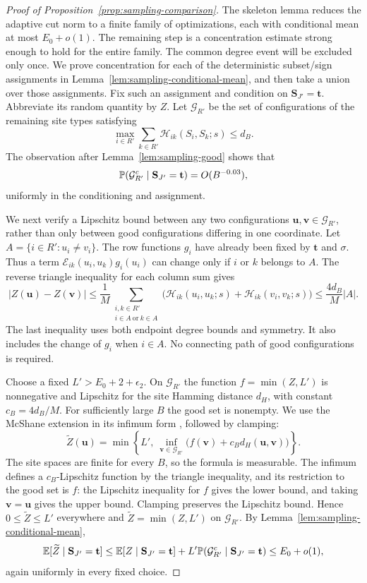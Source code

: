 \begin{proof}[Proof of Proposition~\ref{prop:sampling-comparison}]
The skeleton lemma reduces the adaptive cut norm to a finite family of
optimizations, each with conditional mean at most $E_0+o(1)$. The remaining
step is a concentration estimate strong enough to hold for the entire
family. The common degree event will be excluded only once.
We prove concentration for each of the deterministic subset/sign
assignments in Lemma~\ref{lem:sampling-conditional-mean}, and then
take a union over those assignments.  Fix such an assignment and
condition on $\mathbf S_{J'}=\mathbf t$.  Abbreviate its random
quantity by $Z$.  Let $\mathcal G_{R'}$ be the set of configurations
of the remaining site types satisfying
\[
 \max_{i\in R'}\sum_{k\in R'}
                \mathcal H_{ik}(S_i,S_k;s)\le d_B.
\]
The observation after Lemma~\ref{lem:sampling-good} shows that
\[
 \mathbb P(\mathcal G_{R'}^c\mid\mathbf S_{J'}=\mathbf t)
       =O(B^{-0.03}),
\]
uniformly in the conditioning and assignment.

We next verify a Lipschitz bound between any two configurations
$\mathbf u,\mathbf v\in\mathcal G_{R'}$, rather than only
between good configurations differing in one coordinate.  Let
$A=\{i\in R':u_i\ne v_i\}$.  The row functions $g_i$ have
already been fixed by $\mathbf t$ and $\sigma$.  Thus a term
$\mathcal E_{ik}(u_i,u_k)g_i(u_i)$ can change only if $i$ or $k$
belongs to $A$.  The reverse triangle inequality for each column
sum gives
\[
 |Z(\mathbf u)-Z(\mathbf v)|
 \le\frac1M
   \sum_{\substack{i,k\in R'\\ i\in A\ \text{or}\ k\in A}}
       \big(\mathcal H_{ik}(u_i,u_k;s)
             +\mathcal H_{ik}(v_i,v_k;s)\big)
 \le\frac{4d_B}{M}|A|.
\]
The last inequality uses both endpoint degree bounds and symmetry.
It also includes the change of $g_i$ when $i\in A$.  No connecting
path of good configurations is required.

Choose a fixed $L'>E_0+2+\epsilon_2$.  On $\mathcal G_{R'}$
the function $f=\min(Z,L')$ is nonnegative and Lipschitz for the
site Hamming distance $d_H$, with constant $c_B=4d_B/M$.
For sufficiently large $B$ the good set is nonempty.  We use the
McShane extension \citep{McShane1934} in its infimum form
\citep[Section~3, Equation~(3.2)]{Caputti1984}, followed by clamping:
\[
 \widetilde Z(\mathbf u)
 =\min\left\{L',\ \inf_{\mathbf v\in\mathcal G_{R'}}
             \big(f(\mathbf v)+c_Bd_H(\mathbf u,\mathbf v)\big)
       \right\}.
\]
The site spaces are finite for every $B$, so the formula is
measurable.  The infimum defines a $c_B$-Lipschitz function by
the triangle inequality, and its restriction to the good set is
$f$: the Lipschitz inequality for $f$ gives the lower bound,
and taking $\mathbf v=\mathbf u$ gives the upper bound.
Clamping preserves the Lipschitz bound.  Hence
$0\le\widetilde Z\le L'$ everywhere and
$\widetilde Z=\min(Z,L')$ on $\mathcal G_{R'}$.
By Lemma~\ref{lem:sampling-conditional-mean},
\[
 \mathbb E[\widetilde Z\mid\mathbf S_{J'}=\mathbf t]
 \le\mathbb E[Z\mid\mathbf S_{J'}=\mathbf t]
      +L'\mathbb P(\mathcal G_{R'}^c\mid\mathbf S_{J'}=\mathbf t)
 \le E_0+o(1),
\]
again uniformly in every fixed choice.


\end{proof}
